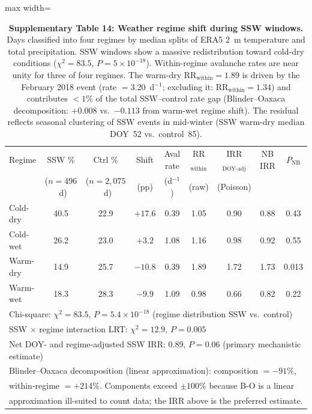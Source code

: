 \documentclass[11pt,letterpaper]{article}
\begin{document}
\begin{table}[!ht]
\centering
\caption{\textbf{Supplementary Table 14: Weather regime shift during SSW windows.}
Days classified into four regimes by median splits of ERA5 2~m temperature and total precipitation. SSW windows show a massive redistribution toward cold-dry conditions ($\chi^2 = 83.5$, $P = 5 \times 10^{-18}$). Within-regime avalanche rates are near unity for three of four regimes. The warm-dry $\mathrm{RR}_{\mathrm{within}} = 1.89$ is driven by the February 2018 event (rate $= 3.20$~d$^{-1}$; excluding it: $\mathrm{RR}_{\mathrm{within}} = 1.34$) and contributes $< 1\%$ of the total SSW--control rate gap (Blinder--Oaxaca decomposition: $+0.008$ vs.\ $-0.113$ from warm-wet regime shift). The residual reflects seasonal clustering of SSW events in mid-winter (SSW warm-dry median DOY~52 vs.\ control~85).}
\label{tab:regime}
\label{tab:regimes}
\small
\begin{adjustbox}{max width=\textwidth}
\begin{tabular}{lcccccccc}
\toprule
Regime & SSW \% & Ctrl \% & Shift & Aval rate & RR$_{\mathrm{within}}$ & IRR$_{\mathrm{DOY\text{-}adj}}$ & NB IRR & $P_{\mathrm{NB}}$ \\
 & ($n = 496$~d) & ($n = 2{,}075$~d) & (pp) & (d$^{-1}$) & (raw) & (Poisson) & & \\
\midrule
Cold-dry & 40.5 & 22.9 & $+17.6$ & 0.39 & 1.05 & 0.90 & 0.88 & 0.43 \\
Cold-wet & 26.2 & 23.0 & $+3.2$ & 1.08 & 1.16 & 0.98 & 0.92 & 0.55 \\
Warm-dry & 14.9 & 25.7 & $-10.8$ & 0.39 & 1.89 & 1.72 & 1.73 & 0.013 \\
Warm-wet & 18.3 & 28.3 & $-9.9$ & 1.09 & 0.98 & 0.66 & 0.82 & 0.22 \\
\midrule
\multicolumn{9}{l}{Chi-square: $\chi^2 = 83.5$, $P = 5.4 \times 10^{-18}$ (regime distribution SSW vs.\ control)} \\
\multicolumn{9}{l}{SSW $\times$ regime interaction LRT: $\chi^2 = 12.9$, $P = 0.005$} \\
\multicolumn{9}{l}{Net DOY- and regime-adjusted SSW IRR: 0.89, $P = 0.06$ (primary mechanistic estimate)} \\
\multicolumn{9}{l}{\footnotesize Blinder--Oaxaca decomposition (linear approximation): composition $= -91\%$,} \\
\multicolumn{9}{l}{\footnotesize within-regime $= +214\%$. Components exceed $\pm 100\%$ because B-O is a linear} \\
\multicolumn{9}{l}{\footnotesize approximation ill-suited to count data; the IRR above is the preferred estimate.} \\
\bottomrule
\end{tabular}
\end{adjustbox}
\end{table}
\end{document}
